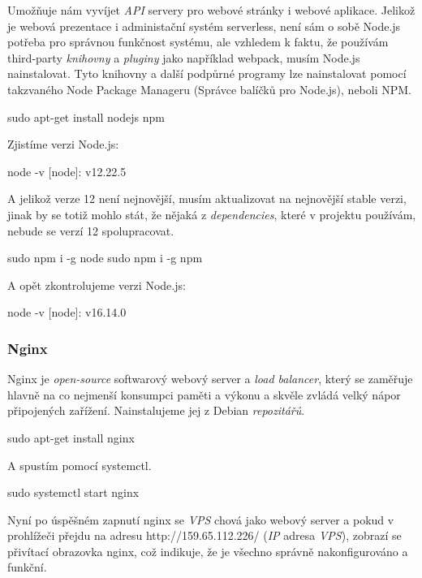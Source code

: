 \documentclass[12pt,a4paper]{report}
\begin{document}
  Umožňuje nám vyvíjet \emph{API} servery pro webové stránky i webové aplikace. 
  Jelikož je webová prezentace i administační systém serverless, není sám o sobě Node.js potřeba pro správnou funkčnost systému,
   ale vzhledem k faktu, že
  používám third-party \emph{knihovny} a \emph{pluginy} jako například webpack, musím Node.js nainstalovat. Tyto knihovny a další podpůrné programy 
  lze nainstalovat pomocí takzvaného Node Package Manageru (Správce balíčků pro Node.js), neboli NPM.
  \begin{bash}
    sudo apt-get install nodejs npm
  \end{bash}
  Zjistíme verzi Node.js:
  \begin{bash}
    node -v
    [node]: v12.22.5
  \end{bash}
  \clearpage
  A jelikož verze 12 není nejnovější, musím aktualizovat na nejnovější stable verzi, jinak by se totiž mohlo stát, 
  že nějaká z \emph{dependencies}, které v projektu používám, nebude se verzí 12 spolupracovat.
  \begin{bash}
    sudo npm i -g node
    sudo npm i -g npm
  \end{bash}
  A opět zkontrolujeme verzi Node.js:
  \begin{bash}
    node -v
    [node]: v16.14.0
  \end{bash}
  \subsubsection{Nginx}
  Nginx je \emph{open-source} softwarový webový server a  \emph{load balancer}, který se zaměřuje hlavně na co
  nejmenší konsumpci paměti a výkonu a skvěle zvládá velký nápor připojených zařížení.
  Nainstalujeme jej z Debian \emph{repozitářů}.
  \begin{bash}
    sudo apt-get install nginx
  \end{bash}
  A spustím pomocí systemctl.
  \begin{bash}
    sudo systemctl start nginx
  \end{bash}
  Nyní po úspěšném zapnutí nginx se \emph{VPS} chová jako webový server a pokud v prohlížeči přejdu na adresu http://159.65.112.226/ (\emph{IP} adresa \emph{VPS}),
   zobrazí se přivítací obrazovka nginx, což indikuje, že je všechno správně nakonfigurováno a funkční. 
  
\end{document}
